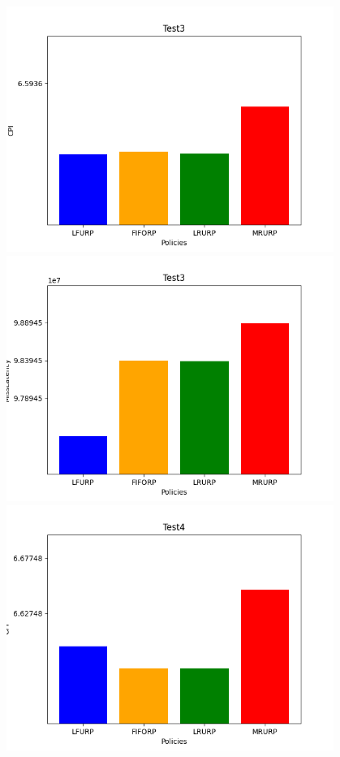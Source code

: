 ‫\includegraphics[width=0.8\textwidth]{graph/csv3CPI.png}\\
‫\includegraphics[width=0.8\textwidth]{graph/csv3Miss.png}\\
‫\includegraphics[width=0.8\textwidth]{graph/csv4CPI.png}\\
